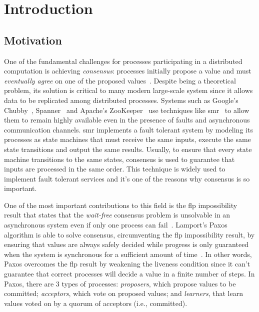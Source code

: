 
\chapter{Introduction}
\section{Motivation}
One of the fundamental challenges for processes participating in a distributed computation is achieving \emph{consensus}: processes initially propose a value and must \emph{eventually agree} on one of the proposed values~\cite{Fischer1985}. Despite being a theoretical problem, its solution is critical to many modern large-scale system since it allows data to be replicated among distributed processes. Systems such as Google's Chubby~\cite{Burrows2006}, Spanner~\cite{Corbett2012} and Apache's ZooKeeper~\cite{Hunt2010} use techniques like \acrfull{smr}~\cite{time-clocks,Schneider1990} to allow them to remain highly available even in the presence of faults and asynchronous communication channels. \acrshort{smr} implements a fault tolerant system by modeling its processes as state machines that must receive the same inputs, execute the same state transitions and output the same results. Usually, to ensure that every state machine transitions to the same states, consensus is used to guarantee that inputs are processed in the same order. This technique is widely used to implement fault tolerant services and it's one of the reasons why consensus is so important.\par
One of the most important contributions to this field is the \acrfull{flp} impossibility result that states that the \textit{wait-free} consensus problem is unsolvable in an asynchronous system even if only one process can fail~\cite{Fischer1985}. Lamport's Paxos algorithm is able to solve consensus, circumventing the \acrshort{flp} impossibility result, by ensuring that values are always safely decided while progress is only guaranteed when the system is synchronous for a sufficient amount of time~\cite{Lamport2001}. In other words, Paxos overcomes the \acrshort{flp} result by weakening the liveness condition since it can't guarantee that correct processes will decide a value in a finite number of steps. In Paxos, there are 3 types of processes: \textit{proposers}, which propose values to be committed; \textit{acceptors}, which vote on proposed values; and \textit{learners}, that learn values voted on by a quorum of acceptors (i.e., committed).\par

